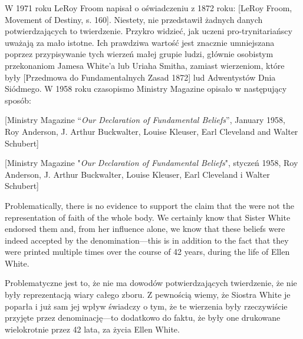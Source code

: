W 1971 roku LeRoy Froom napisał o oświadczeniu z 1872 roku: [LeRoy Froom, Movement of Destiny, s. 160]. Niestety, nie przedstawił żadnych danych potwierdzających to twierdzenie. Przykro widzieć, jak uczeni pro-trynitariańscy uważają  za mało istotne. Ich prawdziwa wartość jest znacznie umniejszana poprzez przypisywanie tych wierzeń małej grupie ludzi, głównie osobistym przekonaniom Jamesa White'a lub Uriaha Smitha, zamiast wierzeniom, które były [Przedmowa do Fundamentalnych Zasad 1872] lud Adwentystów Dnia Siódmego. W 1958 roku czasopismo Ministry Magazine opisało  w następujący sposób:


[Ministry Magazine “\textit{Our Declaration of Fundamental Beliefs}”, January 1958, Roy Anderson, J. Arthur Buckwalter, Louise Kleuser, Earl Cleveland and Walter Schubert]


[Ministry Magazine "\textit{Our Declaration of Fundamental Beliefs}", styczeń 1958, Roy Anderson, J. Arthur Buckwalter, Louise Kleuser, Earl Cleveland i Walter Schubert]


Problematically, there is no evidence to support the claim that the  were not the representation of faith of the whole body. We certainly know that Sister White endorsed them and, from her influence alone, we know that these beliefs were indeed accepted by the denomination—this is in addition to the fact that they were printed multiple times over the course of 42 years, during the life of Ellen White.


Problematyczne jest to, że nie ma dowodów potwierdzających twierdzenie, że  nie były reprezentacją wiary całego zboru. Z pewnością wiemy, że Siostra White je poparła i już sam jej wpływ świadczy o tym, że te wierzenia były rzeczywiście przyjęte przez denominację—to dodatkowo do faktu, że były one drukowane wielokrotnie przez 42 lata, za życia Ellen White.


